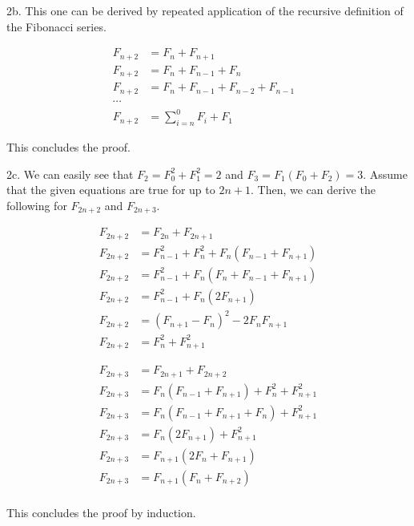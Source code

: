 \documentclass{article}
\begin{document}
2b. This one can be derived by repeated application of the recursive definition of the Fibonacci series.

\begin{align*}
    F_{n + 2} &= F_n + F_{n + 1} & \\
    F_{n + 2} &= F_n + F_{n - 1} + F_n \\
    F_{n + 2} &= F_n + F_{n - 1} + F_{n - 2} + F_{n - 1} \\
    \cdots \\
    F_{n + 2} &= \sum_{i = n}^0F_i + F_1
\end{align*}

This concludes the proof.

2c. We can easily see that $F_2 = F_0^2 + F_1^2 = 2$ and $F_3 = F_1(F_0 + F_2) = 3$. Assume that the given equations are true for up to $2n + 1$. Then, we can derive the following for $F_{2n + 2}$ and $F_{2n + 3}$.

\begin{align*}
    F_{2n + 2} &= F_{2n} + F_{2n + 1} \\
    F_{2n + 2} &= F_{n - 1}^2 + F_n^2 + F_n(F_{n - 1} + F_{n + 1}) \\
    F_{2n + 2} &= F_{n - 1}^2 + F_n(F_n + F_{n - 1} + F_{n + 1}) \\
    F_{2n + 2} &= F_{n - 1}^2 + F_n(2F_{n + 1}) \\
    F_{2n + 2} &= (F_{n + 1} - F_n)^2 - 2F_nF_{n + 1} \\
    F_{2n + 2} &= F_n^2 + F_{n + 1}^2
\end{align*}

\begin{align*}
    F_{2n + 3} &= F_{2n + 1} + F_{2n + 2} \\
    F_{2n + 3} &= F_n(F_{n - 1} + F_{n + 1}) + F_n^2 + F_{n + 1}^2 \\
    F_{2n + 3} &= F_n(F_{n - 1} + F_{n + 1} + F_n) + F_{n + 1}^2 \\
    F_{2n + 3} &= F_n(2F_{n + 1}) + F_{n + 1}^2 \\
    F_{2n + 3} &= F_{n + 1}(2F_n + F_{n + 1}) \\
    F_{2n + 3} &= F_{n + 1}(F_n + F_{n + 2}) \\
\end{align*}

This concludes the proof by induction.
\end{document}
